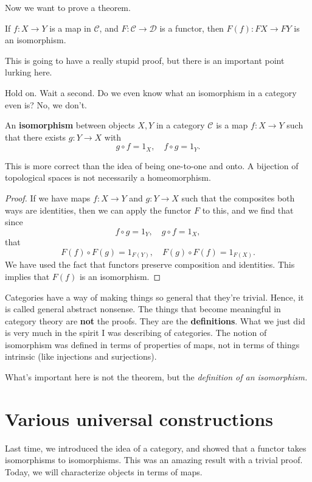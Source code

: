 Now we want to prove a theorem.
\begin{theorem}
If $f: X \to Y$ is a map in $\mathcal{C}$, and $F: \mathcal{C} \to \mathcal{D}$
is a functor, then $F(f): FX \to FY$ is an isomorphism.
\end{theorem}
This is going to have a really stupid proof, but there is an important point
lurking here.

Hold on. Wait a second. Do we even know what an isomorphism in a category even
is? No, we don't.

\begin{definition}
An \textbf{isomorphism} between objects $X, Y$ in a category $\mathcal{C}$ is a
map $f: X \to Y$ such that there exists $g: Y \to X$ with
\[ g \circ f = 1_X, \quad f \circ g = 1_Y.  \]
\end{definition}

This is more correct than the idea of being one-to-one and onto. A bijection of
topological spaces is not necessarily a homeomorphism.


\begin{proof}
If we have maps $f: X \to Y$ and $g : Y \to X$ such that the composites both
ways are identities, then we can apply the functor $F$ to this, and we find
that since
\[ f \circ g = 1_Y, \quad g \circ f = 1_X,   \]
that
\[ F(f) \circ F(g) = 1_{F(Y)}, \quad F(g) \circ F(f) = 1_{F(X)}.  \]
We have used the fact that functors preserve composition and identities. This
implies that $F(f)$ is an isomorphism.
\end{proof}

Categories have a way of making things so general that they're trivial. Hence,
it is called general abstract nonsense. The things that become meaningful in
category theory are \textbf{not} the proofs. They are the \textbf{definitions}.
What we just did is very much in the spirit I was describing of categories. The
notion of isomorphism was defined in terms of properties of maps, not in terms
of things intrinsic (like injections and surjections).

What's important here is not the theorem, but the \emph{definition of an
isomorphism.}



\section{Various universal constructions}

Last time, we introduced the idea of a category, and showed that a functor
takes isomorphisms to isomorphisms.  This was an amazing result with a trivial
proof.  Today, we will characterize objects in terms of maps.
